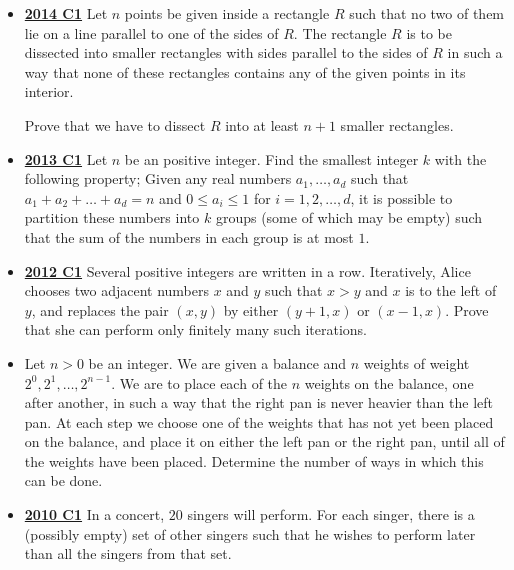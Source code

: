 \documentclass[11pt]{scrartcl}
\begin{document}
\begin{itemize}[leftmargin=*]
    Prove that there is exactly one town that cannot be swept away by any other one.
    \item \href{https://artofproblemsolving.com/community/c6h1113183p5083543}{\textbf{2014 C1}} Let $n$ points be given inside a rectangle $R$ such that no two of them lie on a line parallel to one of the sides of $R$. The rectangle $R$ is to be dissected into smaller rectangles with sides parallel to the sides of $R$ in such a way that none of these rectangles contains any of the given points in its interior. 
    
    Prove that we have to dissect $R$ into at least $n + 1$ smaller rectangles.

    \newpage
    
    \item \href{https://artofproblemsolving.com/community/c6h597127p3543383}{\textbf{2013 C1}} Let $n$ be an positive integer. Find the smallest integer $k$ with the following property; Given any real numbers $a_1 , \dots , a_d $ such that $a_1 + a_2 + \dots + a_d = n$ and $0 \leqslant a_i \leqslant 1$ for $i=1,2,\dots ,d$, it is possible to partition these numbers into $k$ groups (some of which may be empty) such that the sum of the numbers in each group is at most $1$.
    \item \href{https://artofproblemsolving.com/community/c6h546168p3160559}{\textbf{2012 C1}} Several positive integers are written in a row. Iteratively, Alice chooses two adjacent numbers $x$ and $y$ such that $x>y$ and $x$ is to the left of $y$, and replaces the pair $(x,y)$ by either $(y+1,x)$ or $(x-1,x)$. Prove that she can perform only finitely many such iterations.
    \item {} Let $n > 0$ be an integer. We are given a balance and $n$ weights of weight $2^0, 2^1, \dots, 2^{n-1}$. We are to place each of the $n$ weights on the balance, one after another, in such a way that the right pan is never heavier than the left pan. At each step we choose one of the weights that has not yet been placed on the balance, and place it on either the left pan or the right pan, until all of the weights have been placed. Determine the number of ways in which this can be done.
    \item \href{https://artofproblemsolving.com/community/c6h418685p2362292}{\textbf{2010 C1}} 	In a concert, $20$ singers will perform. For each singer, there is a (possibly empty) set of other singers such that he wishes to perform later than all the singers from that set. 
    

\end{itemize}
\end{document}
